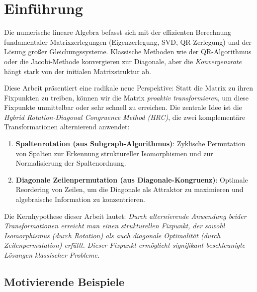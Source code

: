 \documentclass[a4paper,12pt]{article}
\theoremstyle{definition}
\begin{document}
\tableofcontents

\newpage

\section{Einführung}

Die numerische lineare Algebra befasst sich mit der effizienten Berechnung fundamentaler Matrixzerlegungen (Eigenzerlegung, SVD, QR-Zerlegung) und der Lösung großer Gleichungssysteme. Klassische Methoden wie der QR-Algorithmus oder die Jacobi-Methode konvergieren zur Diagonale, aber die \emph{Konvergenzrate} hängt stark von der initialen Matrixstruktur ab.

Diese Arbeit präsentiert eine radikale neue Perspektive: Statt die Matrix zu ihren Fixpunkten zu treiben, können wir die Matrix \emph{proaktiv transformieren}, um diese Fixpunkte unmittelbar oder sehr schnell zu erreichen. Die zentrale Idee ist die \emph{Hybrid Rotation-Diagonal Congruence Method (HRC)}, die zwei komplementäre Transformationen alternierend anwendet:

\begin{enumerate}
	\item \textbf{Spaltenrotation (aus Subgraph-Algorithmus)}: Zyklische Permutation von Spalten zur Erkennung struktureller Isomorphismen und zur Normalisierung der Spaltenordnung.
	\item \textbf{Diagonale Zeilenpermutation (aus Diagonale-Kongruenz)}: Optimale Reordering von Zeilen, um die Diagonale als Attraktor zu maximieren und algebraische Information zu konzentrieren.
\end{enumerate}

Die Kernhypothese dieser Arbeit lautet: \emph{Durch alternierende Anwendung beider Transformationen erreicht man einen strukturellen Fixpunkt, der sowohl Isomorphismus (durch Rotation) als auch diagonale Optimalität (durch Zeilenpermutation) erfüllt. Dieser Fixpunkt ermöglicht signifikant beschleunigte Lösungen klassischer Probleme.}

\subsection{Motivierende Beispiele}
\end{document}
